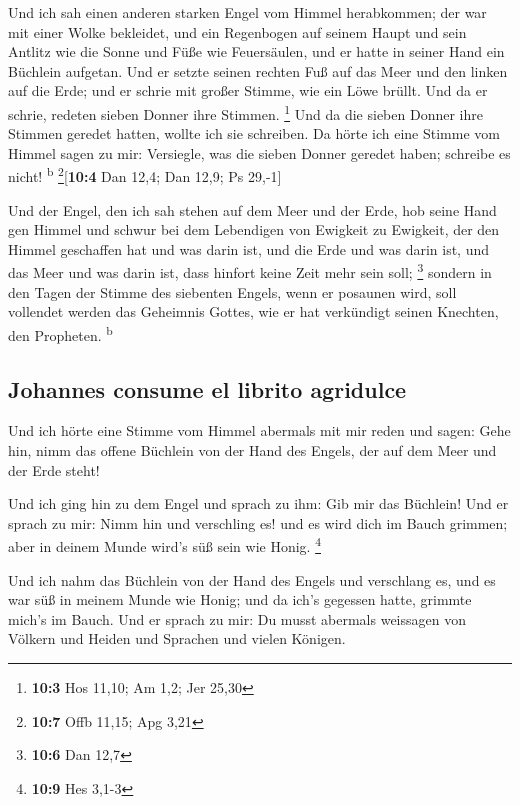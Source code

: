  Und ich sah einen anderen starken Engel vom Himmel
herabkommen; der war mit einer Wolke bekleidet, und ein Regenbogen auf
seinem Haupt und sein Antlitz wie die Sonne und Füße wie Feuersäulen,
 und er hatte in seiner Hand ein Büchlein aufgetan. Und er
setzte seinen rechten Fuß auf das Meer und den linken auf die Erde;
 und er schrie mit großer Stimme, wie ein Löwe brüllt. Und
da er schrie, redeten sieben Donner ihre Stimmen. \footnote{\textbf{10:3}
  Hos 11,10; Am 1,2; Jer 25,30}  Und da die sieben Donner
ihre Stimmen geredet hatten, wollte ich sie schreiben. Da hörte ich eine
Stimme vom Himmel sagen zu mir: Versiegle, was die sieben Donner geredet
haben; schreibe es nicht! \textsuperscript{b}
\footnote{\textbf{10:7} Offb 11,15; Apg 3,21}{[}\textbf{10:4} Dan 12,4;
Dan 12,9; Ps 29,-1{]}

 Und der Engel, den ich sah stehen auf dem Meer und der
Erde, hob seine Hand gen Himmel  und schwur bei dem
Lebendigen von Ewigkeit zu Ewigkeit, der den Himmel geschaffen hat und
was darin ist, und die Erde und was darin ist, und das Meer und was
darin ist, dass hinfort keine Zeit mehr sein soll; \footnote{\textbf{10:6}
  Dan 12,7}  sondern in den Tagen der Stimme des siebenten
Engels, wenn er posaunen wird, soll vollendet werden das Geheimnis
Gottes, wie er hat verkündigt seinen Knechten, den Propheten.
\textsuperscript{b}

\hypertarget{johannes-consume-el-librito-agridulce}{%
\subsection{Johannes consume el librito
agridulce}\label{johannes-consume-el-librito-agridulce}}

 Und ich hörte eine Stimme vom Himmel abermals mit mir
reden und sagen: Gehe hin, nimm das offene Büchlein von der Hand des
Engels, der auf dem Meer und der Erde steht!

 Und ich ging hin zu dem Engel und sprach zu ihm: Gib mir
das Büchlein! Und er sprach zu mir: Nimm hin und verschling es! und es
wird dich im Bauch grimmen; aber in deinem Munde wird's süß sein wie
Honig. \footnote{\textbf{10:9} Hes 3,1-3}

 Und ich nahm das Büchlein von der Hand des Engels und
verschlang es, und es war süß in meinem Munde wie Honig; und da ich's
gegessen hatte, grimmte mich's im Bauch.  Und er sprach
zu mir: Du musst abermals weissagen von Völkern und Heiden und Sprachen
und vielen Königen.


